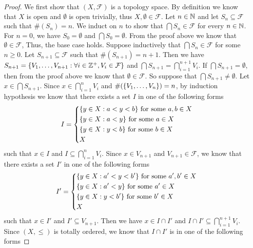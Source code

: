 \begin{proof}
  We first show that \((X, \mathcal{F})\) is a topology space.
  By definition we know that \(X\) is open and \(\emptyset\) is open trivially, thus \(X, \emptyset \in \mathcal{F}\).
  Let \(n \in \mathbb{N}\) and let \(S_n \subseteq \mathcal{F}\) such that \(\#(S_n) = n\).
  We induct on \(n\) to show that \(\bigcap S_n \in \mathcal{F}\) for every \(n \in \mathbb{N}\).
  For \(n = 0\), we have \(S_0 = \emptyset\) and \(\bigcap S_0 = \emptyset\).
  From the proof above we know that \(\emptyset \in \mathcal{F}\), Thus, the base case holds.
  Suppose inductively that \(\bigcap S_n \in \mathcal{F}\) for some \(n \geq 0\).
  Let \(S_{n + 1} \subseteq \mathcal{F}\) such that \(\#(S_{n + 1}) = n + 1\).
  Then we have \(S_{n + 1} = \left\lbrace V_1, \dots, V_{n + 1} : \forall i \in \mathbb{Z}^+, V_i \in \mathcal{F}\right\rbrace\) and \(\bigcap S_{n + 1} = \bigcap_{i = 1}^{n + 1} V_i\).
  If \(\bigcap S_{n + 1} = \emptyset\), then from the proof above we know that \(\emptyset \in \mathcal{F}\).
  So suppose that \(\bigcap S_{n + 1} \neq \emptyset\).
  Let \(x \in \bigcap S_{n + 1}\).
  Since \(x \in \bigcap_{i = 1}^n V_i\) and \(\#(\left\lbrace V_1, \dots, V_n\right\rbrace) = n\), by induction hypothesis we know that there exists a set \(I\) in one of the following forms
  \[
    I = \begin{dcases}
      \set{y \in X : a < y < b} \text{ for some } a, b \in X \\
      \set{y \in X : a < y} \text{ for some } a \in X        \\
      \set{y \in X : y < b} \text{ for some } b \in X        \\
      X
    \end{dcases}
  \]
  such that \(x \in I\) and \(I \subseteq \bigcap_{i = 1}^n V_i\).
  Since \(x \in V_{n + 1}\) and \(V_{n + 1} \in \mathcal{F}\), we know that there exists a set \(I'\) in one of the following forms
  \[
    I' = \begin{dcases}
      \set{y \in X : a' < y < b'} \text{ for some } a', b' \in X \\
      \set{y \in X : a' < y} \text{ for some } a' \in X          \\
      \set{y \in X : y < b'} \text{ for some } b' \in X          \\
      X
    \end{dcases}
  \]
  such that \(x \in I'\) and \(I' \subseteq V_{n + 1}\).
  Then we have \(x \in I \cap I'\) and \(I \cap I' \subseteq \bigcap_{i = 1}^{n + 1} V_i\).
  Since \((X, \leq)\) is totally ordered, we know that \(I \cap I'\) is in one of the following forms

\end{proof}
